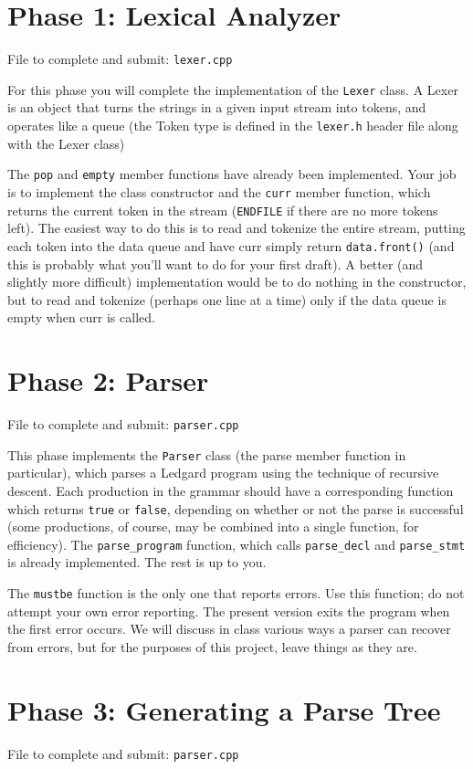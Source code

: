 \documentclass{article}
\begin{document}
\section{Phase 1: Lexical Analyzer}
File to complete and submit: \texttt{lexer.cpp}

For this phase you will complete the implementation of the
\texttt{Lexer} class. A Lexer is an object that turns the strings in
a given input stream into tokens, and operates like a queue (the Token
type is defined in the \texttt{lexer.h} header file along with the
Lexer class)

The \texttt{pop} and \texttt{empty} member functions have already been
implemented. Your job is to implement the class constructor and the
\texttt{curr} member function, which returns the current token in the stream
(\texttt{ENDFILE} if there are no more tokens left). The easiest way to do this
is to read and tokenize the entire stream, putting each token into the
data queue and have curr simply return \texttt{data.front()} (and this is
probably what you'll want to do for your first draft).  A better (and
slightly more difficult) implementation would be to do nothing in the
constructor, but to read and tokenize (perhaps one line at a time)
only if the data queue is empty when curr is called.

\section{Phase 2: Parser}
File to complete and submit: \texttt{parser.cpp}

This phase implements the \texttt{Parser} class (the parse member
function in particular), which parses a Ledgard program using the
technique of recursive descent. Each production in the grammar should
have a corresponding function which returns \texttt{true} or
\texttt{false}, depending on whether or not the parse is successful
(some productions, of course, may be combined into a single function,
for efficiency). The \texttt{parse\_program} function, which calls
\texttt{parse\_decl} and \texttt{parse\_stmt} is already implemented.
The rest is up to you.  

The \texttt{mustbe} function is the only one that reports errors. Use
this function; do not attempt your own error reporting. The present
version exits the program when the first error occurs. We will discuss
in class various ways a parser can recover from errors, but for the
purposes of this project, leave things as they are.


\section{Phase 3: Generating a Parse Tree}
File to complete and submit: \texttt{parser.cpp}
\end{document}
